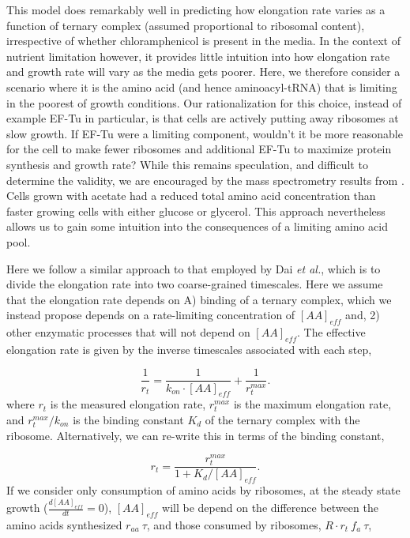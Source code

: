 This model does remarkably well in predicting how elongation rate varies  as a
function of ternary complex (assumed proportional to ribosomal content),
irrespective of whether chloramphenicol is present in the media.  In the context
of nutrient limitation however, it provides little intuition into how elongation
rate and growth rate will vary as the media gets poorer. Here, we therefore
consider a scenario where it is the amino acid (and hence aminoacyl-tRNA) that
is limiting in the poorest of growth conditions. Our rationalization for this
choice, instead of example EF-Tu in particular, is that cells are actively
putting away ribosomes at slow growth. If EF-Tu were a limiting component,
wouldn't it be more reasonable for the cell to make fewer ribosomes and
additional EF-Tu to maximize protein synthesis and growth rate? While this
remains speculation, and difficult to determine the validity, we are encouraged
by the mass spectrometry results from \citep{bennett2009}. Cells grown with
acetate had a reduced total amino acid concentration than faster growing cells
with either glucose or glycerol.  This approach nevertheless allows us to gain
some intuition into the consequences of a limiting amino acid pool.

Here we follow a similar approach to that employed by Dai \textit{et al.}, which
is to divide the elongation rate into two coarse-grained timescales. Here we
assume that the elongation rate depends on A) binding of a ternary complex,
which we instead propose depends on a rate-limiting concentration of $[AA]_{eff}$ and,
2) other enzymatic processes that will not depend on $[AA]_{eff}$. The effective
elongation rate is given by the inverse timescales associated with each step,

\begin{equation}
\frac{1}{r_t} = \frac{1}{k_{on} \cdot [AA]_{eff}} + \frac{1}{r_t^{max}}.
\label{eq:rate_dai_2}
\end{equation}
where $r_t$ is the measured elongation rate, $r_t^{max}$ is the maximum
elongation rate, and $r_t^{max}/k_{on}$ is the binding constant $K_d$ of the
ternary complex with the ribosome. Alternatively, we can re-write this in terms
of the binding constant,

\begin{equation}
r_t = \frac{r_t^{max}}{1 + K_d / [AA]_{eff}}.
\label{eq:rate_Kd}
\end{equation}
If we consider only consumption of amino acids by ribosomes, at the steady state
growth ($\frac{d[AA]_{eff}}{dt} = 0$), $[AA]_{eff}$ will be depend on the difference between
the amino acids synthesized $r_{aa} \ \tau$, and those consumed by ribosomes, $R \cdot r_t \ f_a \ \tau$,

